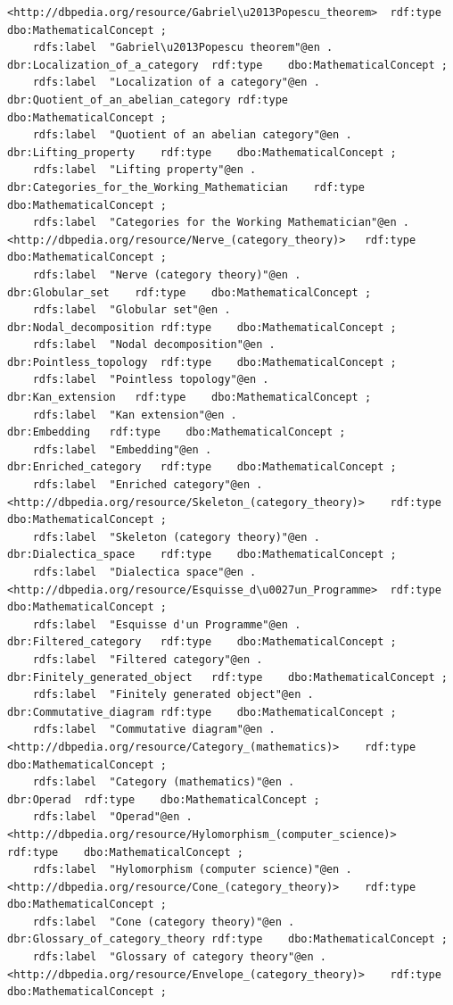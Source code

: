 \begin{verbatim}
<http://dbpedia.org/resource/Gabriel\u2013Popescu_theorem>	rdf:type	dbo:MathematicalConcept ;
	rdfs:label	"Gabriel\u2013Popescu theorem"@en .
dbr:Localization_of_a_category	rdf:type	dbo:MathematicalConcept ;
	rdfs:label	"Localization of a category"@en .
dbr:Quotient_of_an_abelian_category	rdf:type	dbo:MathematicalConcept ;
	rdfs:label	"Quotient of an abelian category"@en .
dbr:Lifting_property	rdf:type	dbo:MathematicalConcept ;
	rdfs:label	"Lifting property"@en .
dbr:Categories_for_the_Working_Mathematician	rdf:type	dbo:MathematicalConcept ;
	rdfs:label	"Categories for the Working Mathematician"@en .
<http://dbpedia.org/resource/Nerve_(category_theory)>	rdf:type	dbo:MathematicalConcept ;
	rdfs:label	"Nerve (category theory)"@en .
dbr:Globular_set	rdf:type	dbo:MathematicalConcept ;
	rdfs:label	"Globular set"@en .
dbr:Nodal_decomposition	rdf:type	dbo:MathematicalConcept ;
	rdfs:label	"Nodal decomposition"@en .
dbr:Pointless_topology	rdf:type	dbo:MathematicalConcept ;
	rdfs:label	"Pointless topology"@en .
dbr:Kan_extension	rdf:type	dbo:MathematicalConcept ;
	rdfs:label	"Kan extension"@en .
dbr:Embedding	rdf:type	dbo:MathematicalConcept ;
	rdfs:label	"Embedding"@en .
dbr:Enriched_category	rdf:type	dbo:MathematicalConcept ;
	rdfs:label	"Enriched category"@en .
<http://dbpedia.org/resource/Skeleton_(category_theory)>	rdf:type	dbo:MathematicalConcept ;
	rdfs:label	"Skeleton (category theory)"@en .
dbr:Dialectica_space	rdf:type	dbo:MathematicalConcept ;
	rdfs:label	"Dialectica space"@en .
<http://dbpedia.org/resource/Esquisse_d\u0027un_Programme>	rdf:type	dbo:MathematicalConcept ;
	rdfs:label	"Esquisse d'un Programme"@en .
dbr:Filtered_category	rdf:type	dbo:MathematicalConcept ;
	rdfs:label	"Filtered category"@en .
dbr:Finitely_generated_object	rdf:type	dbo:MathematicalConcept ;
	rdfs:label	"Finitely generated object"@en .
dbr:Commutative_diagram	rdf:type	dbo:MathematicalConcept ;
	rdfs:label	"Commutative diagram"@en .
<http://dbpedia.org/resource/Category_(mathematics)>	rdf:type	dbo:MathematicalConcept ;
	rdfs:label	"Category (mathematics)"@en .
dbr:Operad	rdf:type	dbo:MathematicalConcept ;
	rdfs:label	"Operad"@en .
<http://dbpedia.org/resource/Hylomorphism_(computer_science)>	rdf:type	dbo:MathematicalConcept ;
	rdfs:label	"Hylomorphism (computer science)"@en .
<http://dbpedia.org/resource/Cone_(category_theory)>	rdf:type	dbo:MathematicalConcept ;
	rdfs:label	"Cone (category theory)"@en .
dbr:Glossary_of_category_theory	rdf:type	dbo:MathematicalConcept ;
	rdfs:label	"Glossary of category theory"@en .
<http://dbpedia.org/resource/Envelope_(category_theory)>	rdf:type	dbo:MathematicalConcept ;

\end{verbatim}
